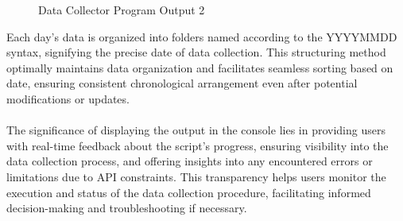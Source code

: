 \begin{figure}[H]
	\centering
	\caption{Data Collector Program Output 2}
	\label{fig: dc out2}
\end{figure}
Each day's data is organized into folders named according to the YYYYMMDD syntax, signifying the precise date of data collection. This structuring method optimally maintains data organization and facilitates seamless sorting based on date, ensuring consistent chronological arrangement even after potential modifications or updates.\\
\\
The significance of displaying the output in the console lies in providing users with real-time feedback about the script's progress, ensuring visibility into the data collection process, and offering insights into any encountered errors or limitations due to \ac{API} constraints. This transparency helps users monitor the execution and status of the data collection procedure, facilitating informed decision-making and troubleshooting if necessary.
